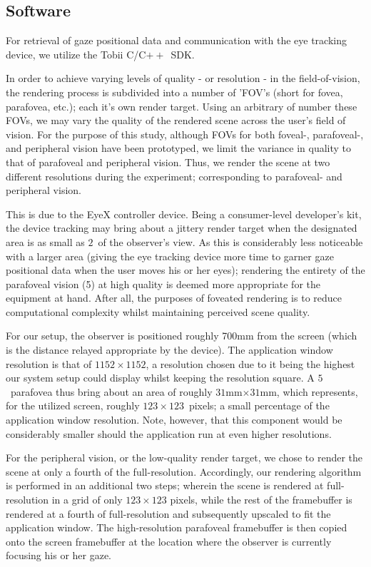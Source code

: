 \subsection{Software}
For retrieval of gaze positional data and communication with the eye tracking device, we utilize the Tobii C/C$++$~SDK.

In order to achieve varying levels of quality - or resolution - in the field-of-vision, the rendering process is subdivided into a number of 'FOV's (short for fovea, parafovea, etc.); each it's own render target.
Using an arbitrary of number these FOVs, we may vary the quality of the rendered scene across the user's field of vision.
For the purpose of this study, although FOVs for both foveal-, parafoveal-, and peripheral vision have been prototyped, we limit the variance in quality to that of parafoveal and peripheral vision.
Thus, we render the scene at two different resolutions during the experiment; corresponding to parafoveal- and peripheral vision.

This is due to the EyeX controller device.
Being a consumer-level developer's kit, the device tracking may bring about a jittery render target when the designated area is as small as $2$\degree\ of the observer's view.
As this is considerably less noticeable with a larger area (giving the eye tracking device more time to garner gaze positional data when the user moves his or her eyes); rendering the entirety of the parafoveal vision (5\degree ) at high quality is deemed more appropriate for the equipment at hand.
After all, the purposes of foveated rendering is to reduce computational complexity whilst maintaining perceived scene quality.

For our setup, the observer is positioned roughly 700mm from the screen (which is the distance relayed appropriate by the device).
The application window resolution is that of $1152\times 1152$, a resolution chosen due to it being the highest our system setup could display whilst keeping the resolution square.
A $5$\degree\ parafovea thus bring about an area of roughly $31$mm$\times $$31$mm, which represents, for the utilized screen, roughly $123\times 123$~pixels; a small percentage of the application window resolution.
Note, however, that this component would be considerably smaller should the application run at even higher resolutions.

For the peripheral vision, or the low-quality render target, we chose to render the scene at only a fourth of the full-resolution.
Accordingly, our rendering algorithm is performed in an additional two steps; wherein the scene is rendered at full-resolution in a grid of only $123\times 123$ pixels, while the rest of the framebuffer is rendered at a fourth of full-resolution and subsequently upscaled to fit the application window.
The high-resolution parafoveal framebuffer is then copied onto the screen framebuffer at the location where the observer is currently focusing his or her gaze.

